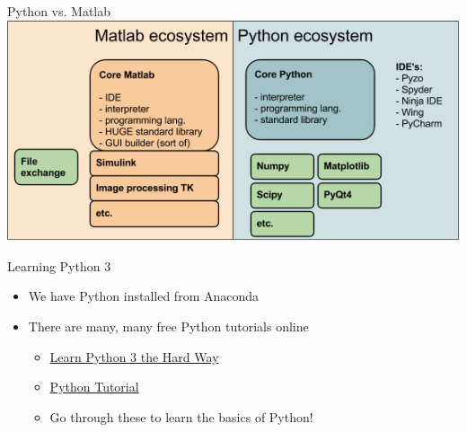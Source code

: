 \documentclass[11pt,professionalfonts]{beamer}
\begin{document}
\begin{frame}{Python vs. Matlab}
    \includegraphics[width=\textwidth, height=\textheight, keepaspectratio]{figures/pythonvsmatlab.png}
\end{frame}

\begin{frame}{Learning Python 3}
    \begin{itemize}
        \item We have Python installed from Anaconda
        \item There are many, many free Python tutorials online
            \begin{itemize}
                \item \href{https://learnpythonthehardway.org/python3/}{Learn Python 3 the Hard Way}
                \item \href{https://docs.python.org/3/tutorial/index.html}{Python Tutorial}
                \item Go through these to learn the basics of Python!
            \end{itemize}
    \end{itemize}
\end{frame}
\end{document}
